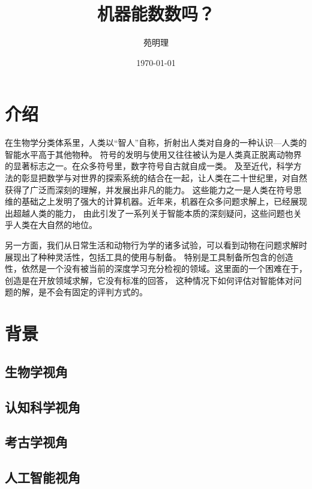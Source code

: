 \documentclass[a4paper,12pt]{article}
\title{机器能数数吗？}
\author{苑明理}
\date{\monthyeardate\today}
\begin{document}
\begingroup
\let\newpage\relax
\maketitle
\endgroup

\renewcommand\contentsname{目录}
\setcounter{tocdepth}{2}
\tableofcontents

\newpage

\section{介绍}

在生物学分类体系里，人类以“智人”自称，折射出人类对自身的一种认识—人类的智能水平高于其他物种。
符号的发明与使用又往往被认为是人类真正脱离动物界的显著标志之一。在众多符号里，数字符号自古就自成一类。
及至近代，科学方法的彰显把数学与对世界的探索系统的结合在一起，让人类在二十世纪里，对自然获得了广泛而深刻的理解，并发展出非凡的能力。
这些能力之一是人类在符号思维的基础之上发明了强大的计算机器。近年来，机器在众多问题求解上，已经展现出超越人类的能力，
由此引发了一系列关于智能本质的深刻疑问，这些问题也关乎人类在大自然的地位。

另一方面，我们从日常生活和动物行为学的诸多试验，可以看到动物在问题求解时展现出了种种灵活性，包括工具的使用与制备。
特别是工具制备所包含的创造性，依然是一个没有被当前的深度学习充分检视的领域。这里面的一个困难在于，创造是在开放领域求解，它没有标准的回答，
这种情况下如何评估对智能体对问题的解，是不会有固定的评判方式的。

\section{背景}

\subsection{生物学视角}

\subsection{认知科学视角}

\subsection{考古学视角}

\subsection{人工智能视角}
\end{document}

